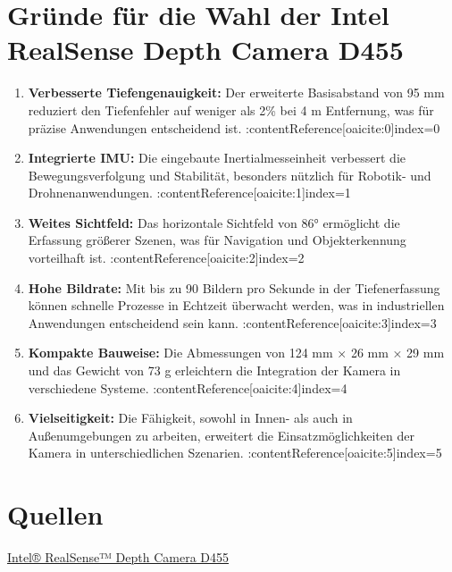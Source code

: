\documentclass[a4paper,12pt]{article}
\begin{document}
\section*{Gründe für die Wahl der Intel RealSense Depth Camera D455}

\begin{enumerate}
    \item \textbf{Verbesserte Tiefengenauigkeit:} Der erweiterte Basisabstand von 95 mm reduziert den Tiefenfehler 
    auf weniger als 2\% bei 4 m Entfernung, was für präzise Anwendungen entscheidend ist. :contentReference[oaicite:0]{index=0}
    \item \textbf{Integrierte IMU:} Die eingebaute Inertialmesseinheit verbessert die Bewegungsverfolgung und 
    Stabilität, besonders nützlich für Robotik- und Drohnenanwendungen. :contentReference[oaicite:1]{index=1}
    \item \textbf{Weites Sichtfeld:} Das horizontale Sichtfeld von 86° ermöglicht die Erfassung größerer Szenen, 
    was für Navigation und Objekterkennung vorteilhaft ist. :contentReference[oaicite:2]{index=2}
    \item \textbf{Hohe Bildrate:} Mit bis zu 90 Bildern pro Sekunde in der Tiefenerfassung können schnelle 
    Prozesse in Echtzeit überwacht werden, was in industriellen Anwendungen entscheidend sein kann. :contentReference[oaicite:3]{index=3}
    \item \textbf{Kompakte Bauweise:} Die Abmessungen von 124 mm × 26 mm × 29 mm und das Gewicht von 73 g 
    erleichtern die Integration der Kamera in verschiedene Systeme. :contentReference[oaicite:4]{index=4}
    \item \textbf{Vielseitigkeit:} Die Fähigkeit, sowohl in Innen- als auch in Außenumgebungen zu arbeiten, 
    erweitert die Einsatzmöglichkeiten der Kamera in unterschiedlichen Szenarien. :contentReference[oaicite:5]{index=5}
\end{enumerate}

\section*{Quellen}
\textcolor{blue}{\href{https://www.intelrealsense.com/depth-camera-d455/}{Intel® RealSense™ Depth Camera D455}}
\end{document}
